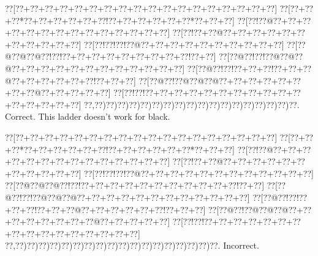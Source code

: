 \documentclass[a5paper]{article}
\begin{document}
\begin{center}
{\goo
\0??[\0??+\0??+\0??+\0??+\0??+\0??+\0??+\0??+\0??+\0??+\0??+\0??+\0??+\0??+\0??+\0??+\0??+\0??]
\0??[\0??+\0??+\0??*\0??+\0??+\0??+\0??+\0??+\0??!\0??+\0??+\0??+\0??+\0??+\0??*\0??+\0??+\0??]
\0??[\0??!\0??@\0??+\0??+\0??+\0??+\0??+\0??+\0??+\0??+\0??+\0??+\0??+\0??+\0??+\0??]
\0??[\0??!\0??+\0??@\0??+\0??+\0??+\0??+\0??+\0??+\0??+\0??+\0??+\0??+\0??]
\0??[\0??!\0??!\0??!\0??@\0??+\0??+\0??+\0??+\0??+\0??+\0??+\0??+\0??+\0??]
\0??[\0??@\0??@\0??@\0??!\0??!\0??+\0??+\0??+\0??+\0??+\0??+\0??+\0??+\0??!\0??+\0??]
\0??[\0??@\0??!\0??!\0??@\0??@\0??@\0??+\0??+\0??+\0??+\0??+\0??+\0??+\0??+\0??+\0??+\0??+\0??]
\0??[\0??@\0??!\0??!\0??+\0??+\0??!\0??+\0??+\0??@\0??+\0??+\0??+\0??+\0??+\0??!\0??+\0??+\0??]
\0??[\0??@\0??!\0??@\0??@\0??@\0??+\0??+\0??+\0??+\0??+\0??+\0??+\0??@\0??+\0??+\0??+\0??+\0??]
\0??[\0??!\0??!\0??+\0??+\0??+\0??+\0??+\0??+\0??+\0??+\0??+\0??+\0??+\0??+\0??+\0??+\0??+\0??]
\0??,\0??)\0??)\0??)\0??)\0??)\0??)\0??)\0??)\0??)\0??)\0??)\0??)\0??)\0??)\0??)\0??)\0??)\0??.
}
Correct. This ladder doesn't work for black.

\end{center}
\begin{center}
{\goo
\0??[\0??+\0??+\0??+\0??+\0??+\0??+\0??+\0??+\0??+\0??+\0??+\0??+\0??+\0??+\0??+\0??+\0??+\0??]
\0??[\0??+\0??+\0??*\0??+\0??+\0??+\0??+\0??+\0??!\0??+\0??+\0??+\0??+\0??+\0??*\0??+\0??+\0??]
\0??[\0??!\0??@\0??+\0??+\0??+\0??+\0??+\0??+\0??+\0??+\0??+\0??+\0??+\0??+\0??+\0??]
\0??[\0??!\0??+\0??@\0??+\0??+\0??+\0??+\0??+\0??+\0??+\0??+\0??+\0??+\0??]
\0??[\0??!\0??!\0??!\0??@\0??+\0??+\0??+\0??+\0??+\0??+\0??+\0??+\0??+\0??+\0??+\0??]
\0??[\0??@\0??@\0??@\0??!\0??!\0??+\0??+\0??+\0??+\0??+\0??+\0??+\0??+\0??+\0??+\0??!\0??+\0??]
\0??[\0??@\0??!\0??!\0??@\0??@\0??@\0??+\0??+\0??+\0??+\0??+\0??+\0??+\0??+\0??+\0??+\0??+\0??]
\0??[\0??@\0??!\0??!\0??+\0??+\0??!\0??+\0??+\0??@\0??+\0??+\0??+\0??+\0??+\0??!\0??+\0??+\0??]
\0??[\0??@\0??!\0??@\0??@\0??@\0??+\0??+\0??+\0??+\0??+\0??+\0??+\0??@\0??+\0??+\0??+\0??+\0??]
\0??[\0??!\0??!\0??+\0??+\0??+\0??+\0??+\0??+\0??+\0??+\0??+\0??+\0??+\0??+\0??+\0??+\0??+\0??]
\0??,\0??)\0??)\0??)\0??)\0??)\0??)\0??)\0??)\0??)\0??)\0??)\0??)\0??)\0??)\0??)\0??)\0??)\0??.
}
Incorrect. 

\end{center}
\end{document}
